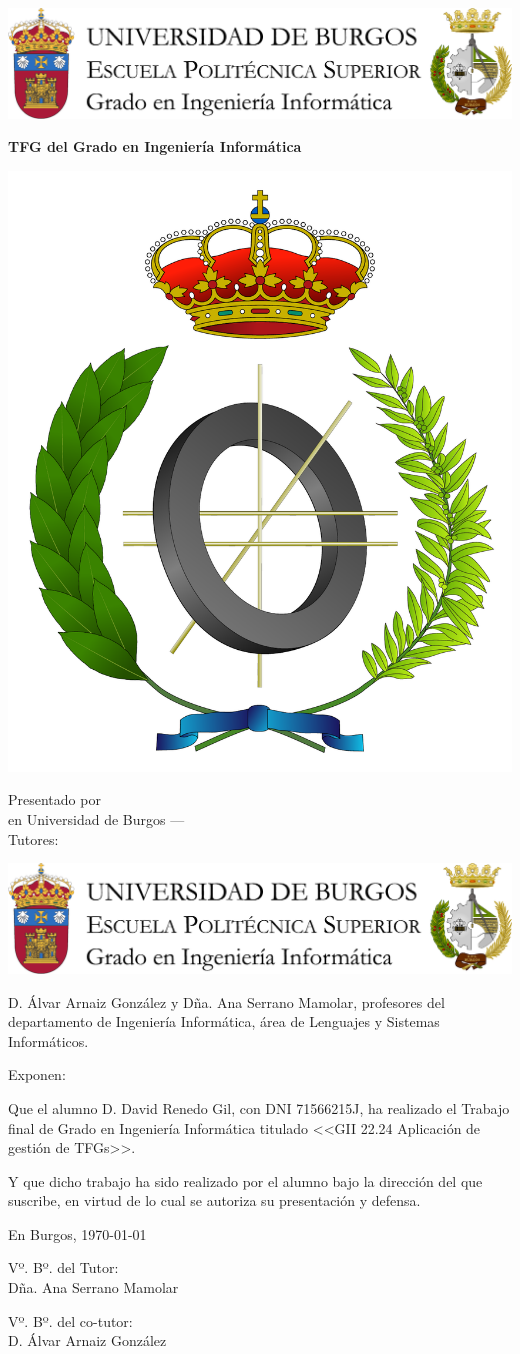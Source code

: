 \documentclass[a4paper,12pt,twoside]{memoir}
\title{\nombreTFG}
\author{\nombre}
\date{\today}
\makeatletter
\def\maketitle{
		\null
		\thispagestyle{empty}
		\noindent\includegraphics[width=\textwidth]{cabecera}\vspace{1cm}%
		\vfill
		\colorbox{cpardoBox}{%
			\begin{minipage}{.8\textwidth}
				\vspace{.5cm}\Large
				\begin{center}
					\textbf{TFG del Grado en Ingeniería Informática}\vspace{.6cm}\\
					\textbf{\LARGE\@title{}}
				\end{center}
				\vspace{.2cm}
			\end{minipage}
			
		}%
		\hfill\begin{minipage}{.20\textwidth}
			\includegraphics[width=\textwidth]{escudoInfor}
		\end{minipage}
		\vfill
		\begin{center}%
			{%
				\noindent\LARGE
				Presentado por \@author{}\\ 
				en Universidad de Burgos --- \@date{}\\
				Tutores: \@tutor{}\\
			}%
		\end{center}%
		\null
		\cleardoublepage
	}
\newcommand{\nombre}{David Renedo Gil} %
\makeatother
\begin{document}
		
		\maketitle
		
		
		\newpage\null\thispagestyle{empty}\newpage
		
		
		\thispagestyle{empty}
		
		
		\noindent\includegraphics[width=\textwidth]{cabecera}\vspace{1cm}
		
		\noindent D. Álvar Arnaiz  González y Dña. Ana Serrano Mamolar, profesores del departamento de Ingeniería Informática, área de Lenguajes y Sistemas Informáticos.
		
		\noindent Exponen:
		
		\noindent Que el alumno D. \nombre, con DNI 71566215J, ha realizado el Trabajo final de Grado en Ingeniería Informática titulado <<GII 22.24 Aplicación de gestión de TFGs>>.
		
		\noindent Y que dicho trabajo ha sido realizado por el alumno bajo la dirección del que suscribe, en virtud de lo cual se autoriza su presentación y defensa.
		
		\begin{center} %
			En Burgos, {\large \today}
		\end{center}
		
		\vfill\vfill\vfill
		
		\begin{minipage}{0.45\textwidth}
			\begin{flushleft} %
				Vº. Bº. del Tutor:\\[2cm]
				Dña. Ana Serrano Mamolar
			\end{flushleft}
		\end{minipage}
		\hfill
		\begin{minipage}{0.45\textwidth}
			\begin{flushleft} %
				Vº. Bº. del co-tutor:\\[2cm]
				D. Álvar Arnaiz González
			\end{flushleft}
		\end{minipage}
		\hfill
		
\end{document}
